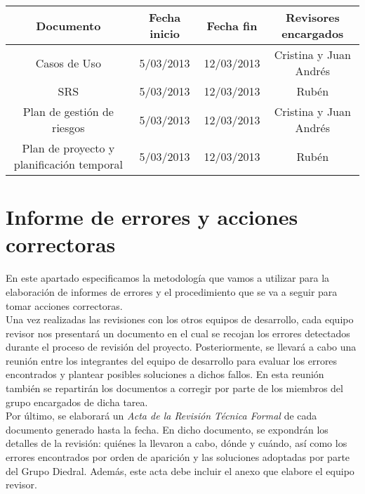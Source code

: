 \documentclass[11pt, a4paper, twoside, titlepage]{article}
\begin{document}
			\begin{center}
			\begin{tabular}{| c | c | c | c |}
				\hline
				\bfseries Documento 	& \bfseries Fecha inicio & \bfseries Fecha fin & \bfseries Revisores encargados	\\ \hline
				Casos de Uso		& 5/03/2013	& 12/03/2013	& Cristina y Juan Andrés	\\ \hline
				SRS 			& 5/03/2013 	& 12/03/2013 	& Rubén				\\ \hline
				Plan de gestión de riesgos & 5/03/2013	& 12/03/2013 	& Cristina y Juan Andrés	\\ \hline
				Plan de proyecto y planificación temporal & 5/03/2013 	& 12/03/2013 & Rubén		\\ \hline
			\end{tabular}
			\end{center}
		
	\section{Informe de errores y acciones correctoras} %
		En este apartado especificamos la metodología que vamos a utilizar para la elaboración de informes de errores y el procedimiento que se va a seguir para tomar acciones correctoras. \\

		Una vez realizadas las revisiones con los otros equipos de desarrollo, cada equipo revisor nos presentará un documento en el cual se recojan los errores detectados durante el proceso de revisión del proyecto. Posteriormente, se llevará a cabo una reunión entre los integrantes del equipo de desarrollo para evaluar los errores encontrados y plantear posibles soluciones a dichos fallos. En esta reunión también se repartirán los documentos a corregir por parte de los miembros del grupo encargados de dicha tarea. \\

		Por último, se elaborará un \textit{Acta de la Revisión Técnica Formal} de cada documento generado hasta la fecha. En dicho documento, se expondrán los detalles de la revisión: quiénes la llevaron a cabo, dónde y cuándo, así como los errores encontrados por orden de aparición %
 y las soluciones adoptadas por parte del Grupo Diedral. Además, este acta debe incluir el anexo que elabore el equipo revisor.
	
\end{document}
